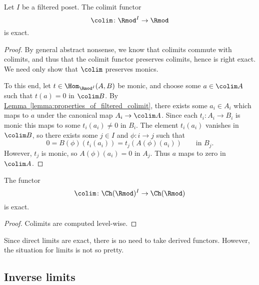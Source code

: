 \documentclass[main.tex]{subfiles}
\begin{document}
\begin{theorem}
  \label{thm:filtered_colimit_left_exact}
  Let $I$ be a filtered poset. The colimit functor
  \begin{equation*}
    \colim\colon \Rmod^{I} \to \Rmod
  \end{equation*}
  is exact.
\end{theorem}
\begin{proof}
  By general abstract nonsense, we know that colimits commute with colimits, and thus that the colimit functor preserves colimits, hence is right exact. We need only show that $\colim$ preserves monics.

  To this end, let $t \in \Hom_{\Rmod^{I}}(A, B)$ be monic, and choose some \(a \in \colim A\) such that \(t(a) = 0\) in \(\colim B\). By \hyperref[lemma:properties_of_filtered_colimit]{Lemma~\ref*{lemma:properties_of_filtered_colimit}}, there exists some \(a_{i} \in A_{i}\) which maps to \(a\) under the canonical map \(A_{i} \to \colim A\). Since each \(t_{i}\colon A_{i} \to B_{i}\) is monic this maps to some \(t_{i}(a_{i}) \neq 0\) in \(B_{i}\). The element \(t_{i}(a_{i})\) vanishes in \(\colim B\), so there exists some \(j \in I\) and \(\phi\colon i \to j\) such that 
  \begin{equation*}
    0 = B(\phi)(t_{i}(a_{i})) = t_{j}(A(\phi)(a_{i}))\qquad\text{in }B_{j}.
  \end{equation*}
  However, \(t_{j}\) is monic, so \(A(\phi)(a_{i}) = 0\) in \(A_{j}\). Thus \(a\) maps to zero in \(\colim A\).
\end{proof}

\begin{corollary}
  \label{cor:filtered_colimits_into_chain_complexes}
  The functor
  \begin{equation*}
    \colim\colon \Ch(\Rmod)^{I} \to \Ch(\Rmod)
  \end{equation*}
  is exact.
\end{corollary}
\begin{proof}
  Colimits are computed level-wise.
\end{proof}

Since direct limits are exact, there is no need to take derived functors. However, the situation for limits is not so pretty.

\subsection{Inverse limits}
\label{ssc:inverse_limits}
\end{document}
